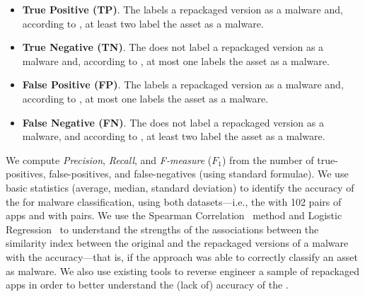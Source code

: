 \begin{itemize}
\item {\bf True Positive (TP)}. The \mas labels a repackaged version as a malware and, according to
  \vt, at least two \ses label the asset as a malware.
  
\item {\bf True Negative (TN)}. The \mas does not label a repackaged version as a malware and,
  according to \vt, at most one \se labels the asset as a malware. 

\item {\bf False Positive (FP)}. The \mas labels a repackaged version as a malware and, according to
  \vt, at most one \se labels the asset as a malware.

\item {\bf False Negative (FN)}. The \mas does not label a repackaged version as a malware, and
  according to \vt, at least two \ses label the asset as a malware.
\end{itemize}

We compute \emph{Precision}, \emph{Recall}, and \emph{F-measure} ($F_1$) from
the number of true-positives, false-positives, and false-negatives (using standard
formulae). We use basic statistics (average, median, standard deviation) to identify the
accuracy of the \mas for malware classification, using both datasets---i.e., the \sds
with 102 pairs of apps and \cds with
\apps pairs. We use the Spearman Correlation~\cite{spearman-correlation} method and
Logistic Regression~\cite{statistical-learning} to understand the strengths of
the associations between the similarity index between the original and the repackaged versions
of a malware with the \mas accuracy---that is,
if the approach was able to correctly classify an asset as malware. We also use existing tools to reverse engineer a sample of repackaged
apps in order to better understand the (lack of) accuracy
of the \mas.







